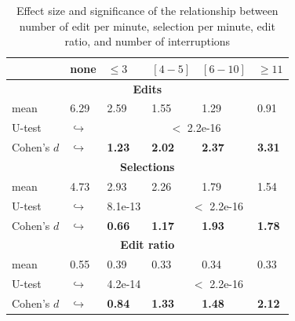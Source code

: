 \documentclass[times]{smrauth}
\begin{document}
\begin{table}[ht!]
\tiny
\renewcommand{\arraystretch}{1.3}
\caption{Effect size and significance of the relationship between number of edit per minute, selection per minute, edit ratio, and number of interruptions} 
\label{tbl:p_value}
\centering
\begin{tabular}{l | p{0.75cm} | p{1.2cm} | p{1.2cm} | p{1.2cm} |p{1.2cm}} 

   & none & $\leq 3$ & $[4 - 5]$ & $[6 - 10]$ & $\geq 11$  \\  
  \hline
  \multicolumn{6}{c}{\textbf{Edits}} \\
  \hline
  mean & 6.29 &	2.59 & 1.55 & 1.29 & 0.91  \\ 
   \cline{3-6} 
  U-test & $\hookrightarrow$ & \multicolumn{4}{c}{$<$ 2.2e-16} \\
  \cline{3-6} 
  Cohen's $d$ & $\hookrightarrow$	& \textbf{1.23} & \textbf{2.02} & \textbf{2.37} & \textbf{3.31}    \\
  \hline
  
  
  \multicolumn{6}{c}{\textbf{Selections}} \\
  \hline 
  mean & 4.73 &	2.93 & 2.26 & 1.79 & 1.54  \\ 
     \cline{3-6} 
    U-test & $\hookrightarrow$ & 8.1e-13 & \multicolumn{3}{c}{$<$ 2.2e-16} \\
    
  \cline{3-6} 
  Cohen's $d$ & $\hookrightarrow$	& \textbf{0.66} & \textbf{1.17} & \textbf{1.93} & \textbf{1.78} \\  
\hline


  \multicolumn{6}{c}{\textbf{Edit ratio}} \\
  \hline 
  mean & 0.55 & 0.39 & 0.33 & 0.34 & 0.33 \\ 
  \cline{3-6} 
     \cline{3-6} 
    U-test & $\hookrightarrow$ & 4.2e-14 & \multicolumn{3}{c}{$<$ 2.2e-16} \\
    \cline{3-6} 
    Cohen's $d$ & $\hookrightarrow$ & \textbf{0.84} & \textbf{1.33} & \textbf{1.48} & \textbf{2.12} \\ 
\hline

\end{tabular}
\end{table}
\end{document}
